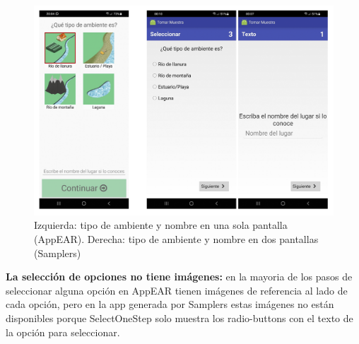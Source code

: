 \begin{figure}[H]
  \centering
   \includegraphics[scale=0.8]{06-caso_de_uso/tipo_y_nombre.png} 
    \caption{Izquierda: tipo de ambiente y nombre en una sola pantalla (AppEAR). Derecha:  tipo de ambiente y nombre en dos pantallas (Samplers)}
\end{figure}

\newpage

\textbf{La selección de opciones no tiene imágenes:} en la mayoria de los pasos de seleccionar alguna opción en AppEAR tienen imágenes de referencia al lado de cada opción, pero en la app generada por Samplers estas imágenes no están disponibles porque SelectOneStep solo muestra los radio-buttons con el texto de la opción para seleccionar.

